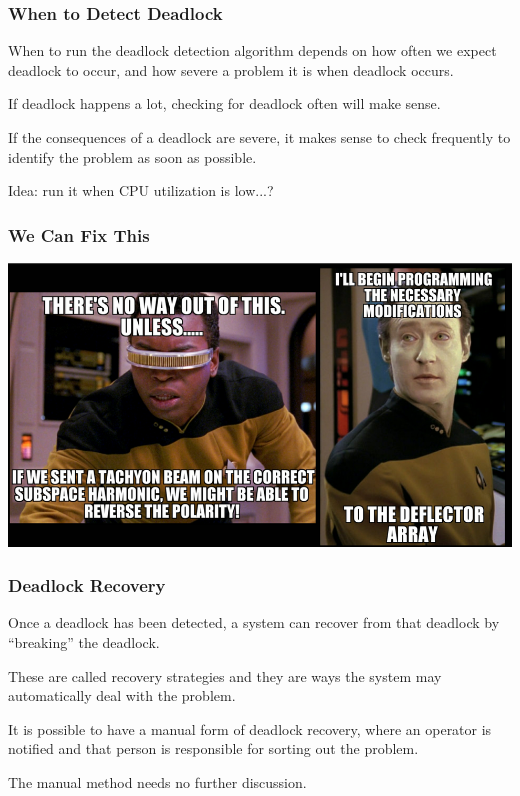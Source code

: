 \begin{frame}
\frametitle{When to Detect Deadlock}

When to run the deadlock detection algorithm depends on how often we expect deadlock to occur, and how severe a problem it is when deadlock occurs. 

If deadlock happens a lot, checking for deadlock often will make sense. 

If the consequences of a deadlock are severe, it makes sense to check frequently to identify the problem as soon as possible. 

Idea: run it when CPU utilization is low...?

\end{frame}


\begin{frame}
\frametitle{We Can Fix This}

\begin{center}
	\includegraphics[width=\textwidth]{images/recovery.png}
\end{center}

\end{frame}


\begin{frame}
\frametitle{Deadlock Recovery}

Once a deadlock has been detected, a system can recover from that deadlock by ``breaking'' the deadlock. 

These are called recovery strategies and they are ways the system may automatically deal with the problem. 

It is possible to have a manual form of deadlock recovery, where an operator is notified and that person is responsible for sorting out the problem.

The manual method needs no further discussion.


\end{frame}

